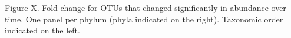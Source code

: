 Figure X. Fold change for OTUs that changed significantly in abundance over time. One panel per phylum (phyla indicated on the right). Taxonomic order indicated on the left.